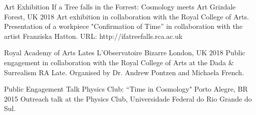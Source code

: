 \begin{cventries}
  \cventry
    {Art Exhibition} %
    {If a Tree falls in the Forrest: Cosmology meets Art} %
    {Grizdale Forest, UK} %
    {2018} %
    {
      {Art exhibition in collaboration with the Royal College of Arts. Presentation of a workpiece "Confirmation of Time” in collaboration with the artist Franziska Hatton. URL: http://ifatreefalls.rca.ac.uk}
    }

  \cventry
    {Royal Academy of Arts Lates} %
    {L'Observatoire Bizarre } %
    {London, UK} %
    {2018} %
    {
    {Public engagement in collaboration with the Royal College of Arts at the Dada \&
Surrealism RA Late. Organised by Dr. Andrew Pontzen and Michaela French.}
    }

  \cventry
    {Public Engagement Talk} %
    {Physics Club: ``Time in Cosmology"} %
    {Porto Alegre, BR} %
    {2015} %
    {
  {Outreach talk at the Physics Club, Universidade Federal do Rio Grande do Sul.}
    }
\end{cventries}
